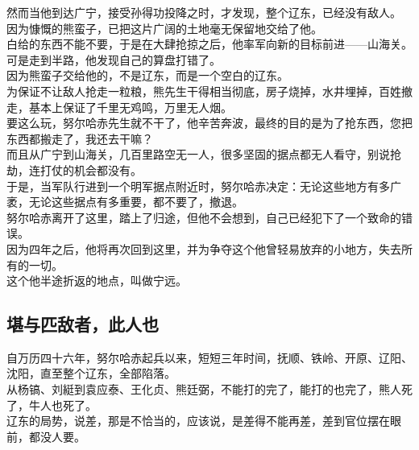 \begin{multicols}{\theparacolNo}
然而当他到达广宁，接受孙得功投降之时，才发现，整个辽东，已经没有敌人。\\

因为慷慨的熊蛮子，已把这片广阔的土地毫无保留地交给了他。\\

白给的东西不能不要，于是在大肆抢掠之后，他率军向新的目标前进——山海关。\\

可是走到半路，他发现自己的算盘打错了。\\

因为熊蛮子交给他的，不是辽东，而是一个空白的辽东。\\

为保证不让敌人抢走一粒粮，熊先生干得相当彻底，房子烧掉，水井埋掉，百姓撤走，基本上保证了千里无鸡鸣，万里无人烟。\\

要这么玩，努尔哈赤先生就不干了，他辛苦奔波，最终的目的是为了抢东西，您把东西都搬走了，我还去干嘛？\\

而且从广宁到山海关，几百里路空无一人，很多坚固的据点都无人看守，别说抢劫，连打仗的机会都没有。\\

于是，当军队行进到一个明军据点附近时，努尔哈赤决定：无论这些地方有多广袤，无论这些据点有多重要，都不要了，撤退。\\

努尔哈赤离开了这里，踏上了归途，但他不会想到，自己已经犯下了一个致命的错误。\\

因为四年之后，他将再次回到这里，并为争夺这个他曾轻易放弃的小地方，失去所有的一切。\\

这个他半途折返的地点，叫做宁远。\\

\subsection{堪与匹敌者，此人也}
自万历四十六年，努尔哈赤起兵以来，短短三年时间，抚顺、铁岭、开原、辽阳、沈阳，直至整个辽东，全部陷落。\\

从杨镐、刘綎到袁应泰、王化贞、熊廷弼，不能打的完了，能打的也完了，熊人死了，牛人也死了。\\

辽东的局势，说差，那是不恰当的，应该说，是差得不能再差，差到官位摆在眼前，都没人要。\\


\end{multicols}
